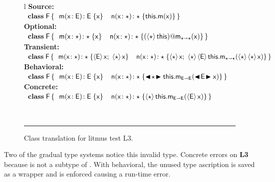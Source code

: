 \documentclass[USenglish]{tex/lipics-v2016}
\begin{document}
\begin{figure}[!h]\small
\hrulefill\\
\\
\begin{tabular}{l}
{\bf Source:} \\[2mm]
\(
\begin{array}{l@{\,}l}
\Class{\xt F}{}{&\Mdef\m\x{\xt E}{\xt E}\x \HS\HS
    \Mdef\n\x\any\any{\Call\this\m\x}} \\
\end{array}
\) \\[2mm]
{\bf Optional:}\\[2mm]
\(
\begin{array}{l@{\,}l}
\Class{\xt F}{}{&\Mdef\m\x{\any}{\any}\x  \HS\HS
    \Mdef\n\x\any\any{\DynCall{(\SubCast\any\this)}\m\x}} 
\end{array}
\) \\[2mm]
{\bf Transient:}\\[2mm]
\(
\begin{array}{l@{\,}l}
\Class{\xt F}{}{
   &\Mdef\m\x\any\any{\SubCast{\xt E}{\x}; ~ \SubCast{\any}{\x} } 
    \HS\HS \Mdef\n\x\any\any{\SubCast{\any}{\x}\sspce 
   \SubCast{\any}{\SubCast{\xt E}{\KCall\this\m{\SubCast\any{\SubCast\any\x}}\any\any}}}} 
\end{array}
\)\\[2mm]
{\bf Behavioral:} \\[2mm]
\(
\begin{array}{l@{\,}l}
\Class{\xt F}{}{&\Mdef\m\x{\xt E}{\xt E}\x \HS\HS
      \Mdef\n\x\any\any{\BehCast\any{\KCall\this\m{\BehCast{\xt E}\x}{\xt E}{\xt E}}}} 
\end{array}
\) \\[2mm]
{\bf Concrete:} \\[2mm]
\(
\begin{array}{l@{\,}l}
\Class{\xt F}{}{&\Mdef\m\x{\xt E}{\xt E}\x  \HS\HS
       \Mdef\n\x\any\any{\SubCast\any{\KCall\this\m{\SubCast{\xt E}\x}{\xt E}{\xt E}}}} 
\end{array}
\) \\
\end{tabular}\vspace{2mm}\\
\hrule\vspace{4mm}

 \caption{Class translation for litmus test L3.} \label{fig:l3trans}
\end{figure}

Two of the gradual type systems notice this invalid type. Concrete errors on
{\bf L3} because \E is not a subtype of \C.  With behavioral, the unused
type ascription is saved as a wrapper and is enforced causing a run-time error.
\end{document}

